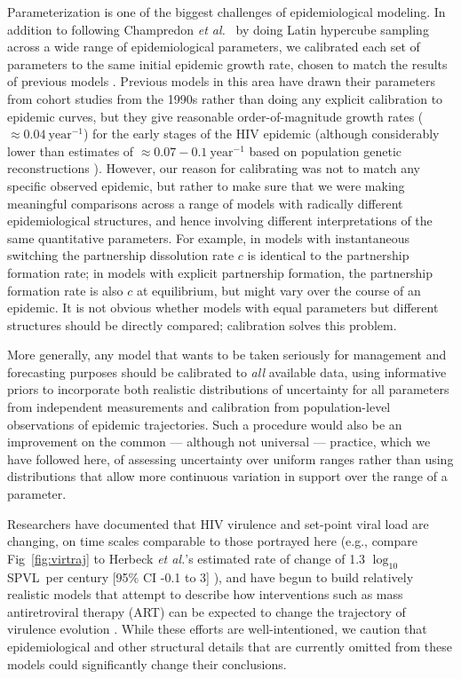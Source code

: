 \documentclass[10pt,letterpaper]{article}
\renewcommand{\figurename}{Fig}
\newcommand{\Lspvl}{$\log_{10}$ SPVL}
\newcommand{\etal}{\textit{et al.}}
\begin{document}
Parameterization is one of the biggest challenges of epidemiological
modeling. In addition to following Champredon \etal\ \cite{champredon_hiv_2013} 
by doing Latin hypercube
sampling across a wide range of epidemiological parameters, we 
calibrated each set of parameters to the same initial epidemic
growth rate, chosen to match the results of previous models
\cite{shirreff_transmission_2011}.  Previous models 
in this area have drawn their
parameters from cohort studies from the 1990s
\cite{wawer2005rates,hollingsworth_hiv1_2008}
rather than doing any explicit calibration to epidemic curves,
but they give reasonable order-of-magnitude
growth rates ($\approx 0.04~\textrm{year}^{-1}$)
for the early stages of the HIV epidemic (although considerably
lower than estimates of $\approx 0.07-0.1~\textrm{year}^{-1}$
based on population genetic reconstructions \cite{faria_early_2014}).
However, our reason for calibrating was not to match any
specific observed epidemic, but rather to make sure that
we were making meaningful comparisons across a range of
models with radically different epidemiological structures, and
hence involving different interpretations of the same quantitative
parameters.  For example, in models with instantaneous switching the
partnership dissolution rate $c$ is identical to the partnership
formation rate; in models with explicit partnership formation,
the partnership formation rate is also $c$ at equilibrium,
but might vary over the course of an epidemic.
It is not obvious whether models with equal parameters but
different structures should be directly compared; calibration
solves this problem.

More generally, any model that wants to be
taken seriously for management and forecasting purposes should
be calibrated to \emph{all} available data, using informative
priors to incorporate both realistic distributions of uncertainty
for all parameters from independent measurements \cite{elderd_uncertainty_2006}
and calibration from population-level observations of epidemic
trajectories. Such a procedure would also be an improvement on the common --- although not universal --- %
practice, which we have followed here,
of assessing uncertainty over uniform ranges rather than
using distributions that allow more continuous variation in support over
the range of a parameter.

Researchers have documented that HIV virulence and set-point viral
load are changing, on time scales comparable to those portrayed here
(e.g., compare \figurename~\ref{fig:virtraj} to Herbeck \etal's
estimated rate of change of 1.3 \Lspvl\ per century [95\% CI -0.1 to
  3] \cite{herbeck_is_2012}), and have begun to build relatively realistic models that
attempt to describe how interventions such as mass antiretroviral
therapy (ART) can be expected to change the trajectory of virulence
evolution \cite{payne_impact_2014,roberts2015impact,herbeck_evolution_2016}.  While these
efforts are well-intentioned, we caution that epidemiological and
other structural details that are currently omitted from these models
could significantly change their conclusions.
\end{document}
